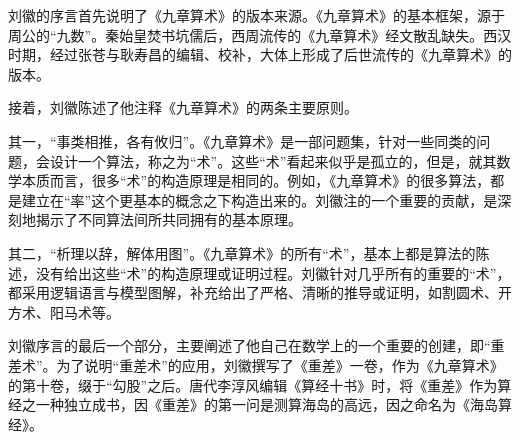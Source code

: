 \documentclass[12pt,UTF8]{ctexbook}
\begin{document}
刘徽的序言首先说明了《九章算术》的版本来源。《九章算术》的基本框架，源于周公的“九数”。秦始皇焚书坑儒后，西周流传的《九章算术》经文散乱缺失。西汉时期，经过张苍与耿寿昌的编辑、校补，大体上形成了后世流传的《九章算术》的版本。

接着，刘徽陈述了他注释《九章算术》的两条主要原则。

其一，“事类相推，各有攸归”。《九章算术》是一部问题集，针对一些同类的问题，会设计一个算法，称之为“术”。这些“术”看起来似乎是孤立的，但是，就其数学本质而言，很多“术”的构造原理是相同的。例如，《九章算术》的很多算法，都是建立在“率”这个更基本的概念之下构造出来的。刘徽注的一个重要的贡献，是深刻地揭示了不同算法间所共同拥有的基本原理。

其二，“析理以辞，解体用图”。《九章算术》的所有“术”，基本上都是算法的陈述，没有给出这些“术”的构造原理或证明过程。刘徽针对几乎所有的重要的“术”，都采用逻辑语言与模型图解，补充给出了严格、清晰的推导或证明，如割圆术、开方术、阳马术等。

刘徽序言的最后一个部分，主要阐述了他自己在数学上的一个重要的创建，即“重差术”。为了说明“重差术”的应用，刘徽撰写了《重差》一卷，作为《九章算术》的第十卷，缀于“勾股”之后。唐代李淳风编辑《算经十书》时，将《重差》作为算经之一种独立成书，因《重差》的第一问是测算海岛的高远，因之命名为《海岛算经》。
\end{document}
